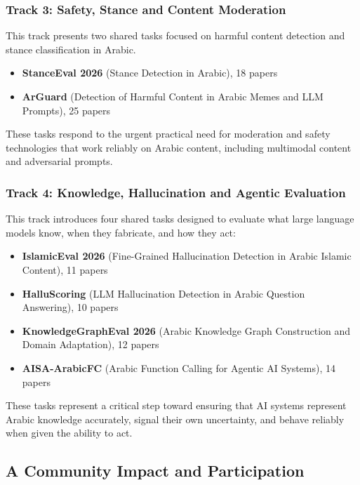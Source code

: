 \subsubsection*{\textbf{Track 3: Safety, Stance and Content Moderation}}

This track presents two shared tasks focused on harmful content detection and stance classification in Arabic.

\begin{itemize}
\item \textbf{StanceEval 2026} (Stance Detection in Arabic), 18 papers  
\item \textbf{ArGuard} (Detection of Harmful Content in Arabic Memes and LLM Prompts), 25 papers
\end{itemize}

These tasks respond to the urgent practical need for moderation and safety technologies that work reliably on Arabic content, including multimodal content and adversarial prompts.

\subsubsection*{\textbf{Track 4: Knowledge, Hallucination and Agentic Evaluation}}

This track introduces four shared tasks designed to evaluate what large language models know, when they fabricate, and how they act:

\begin{itemize}
\item \textbf{IslamicEval 2026} (Fine-Grained Hallucination Detection in Arabic Islamic Content), 11 papers  
\item \textbf{HalluScoring} (LLM Hallucination Detection in Arabic Question Answering), 10 papers  
\item \textbf{KnowledgeGraphEval 2026} (Arabic Knowledge Graph Construction and Domain Adaptation), 12 papers  
\item \textbf{AISA-ArabicFC} (Arabic Function Calling for Agentic AI Systems), 14 papers
\end{itemize}

These tasks represent a critical step toward ensuring that AI systems represent Arabic knowledge accurately, signal their own uncertainty, and behave reliably when given the ability to act.

\subsection*{\textbf{A Community Impact and Participation}}

